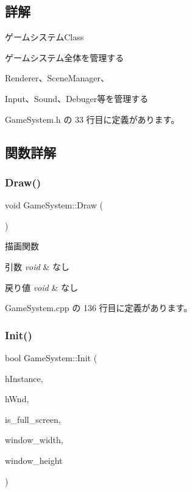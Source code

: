 \subsection{詳解}
ゲームシステム\+Class 

ゲームシステム全体を管理する

Renderer、\+Scene\+Manager、

Input、\+Sound、\+Debuger等を管理する 

 Game\+System.\+h の 33 行目に定義があります。



\subsection{関数詳解}
\mbox{\label{class_game_system_a474db0066b23d39e94e0a830140edce5}} 
\subsubsection{\texorpdfstring{Draw()}{Draw()}}
{\footnotesize\ttfamily void Game\+System\+::\+Draw (\begin{DoxyParamCaption}{ }\end{DoxyParamCaption})}



描画関数 


\begin{DoxyParams}{引数}
{\em void} & なし \\
\hline
\end{DoxyParams}

\begin{DoxyRetVals}{戻り値}
{\em void} & なし \\
\hline
\end{DoxyRetVals}


 Game\+System.\+cpp の 136 行目に定義があります。

\mbox{\label{class_game_system_ad4c08500b98490e00ce87a770bb5e981}} 
\subsubsection{\texorpdfstring{Init()}{Init()}}
{\footnotesize\ttfamily bool Game\+System\+::\+Init (\begin{DoxyParamCaption}\item[{H\+I\+N\+S\+T\+A\+N\+CE}]{h\+Instance,  }\item[{H\+W\+ND}]{h\+Wnd,  }\item[{B\+O\+OL}]{is\+\_\+full\+\_\+screen,  }\item[{int}]{window\+\_\+width,  }\item[{int}]{window\+\_\+height }\end{DoxyParamCaption})}



